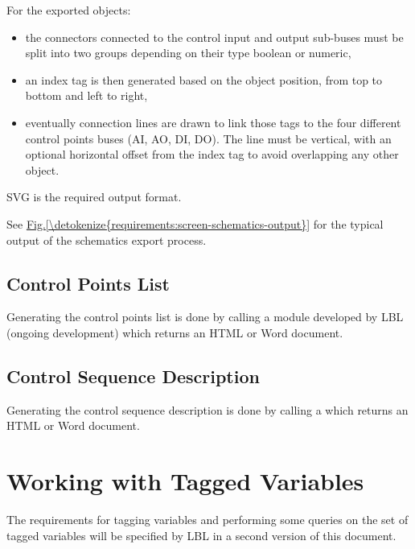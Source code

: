 \documentclass[letterpaper,10pt, openany,english]{sphinxmanual}
\begin{document}
For the exported objects:
\begin{itemize}
\item {} 
the connectors connected to the control input and output sub-buses must be split into two groups depending on their type \textendash{} boolean or numeric,

\item {} 
an index tag is then generated based on the object position, from top to bottom and left to right,

\item {} 
eventually connection lines are drawn to link those tags to the four different control points buses (AI, AO, DI, DO). The line must be vertical, with an optional horizontal offset from the index tag to avoid overlapping any other object.

\end{itemize}

SVG is the required output format.

See \hyperref[\detokenize{requirements:screen-schematics-output}]{Fig.\@ \ref{\detokenize{requirements:screen-schematics-output}}} for the typical output of the schematics export process.


\subsection{Control Points List}
\label{\detokenize{requirements:control-points-list}}
Generating the control points list is done by calling a module developed by LBL (ongoing development) which returns an HTML or Word document.


\subsection{Control Sequence Description}
\label{\detokenize{requirements:control-sequence-description}}
Generating the control sequence description is done by calling a  which returns an HTML or Word document.


\section{Working with Tagged Variables}
\label{\detokenize{requirements:working-with-tagged-variables}}\label{\detokenize{requirements:sec-tagged-variables}}
The requirements for tagging variables and performing some queries on the set of tagged variables will be specified by LBL in a second version of this document.
\end{document}
